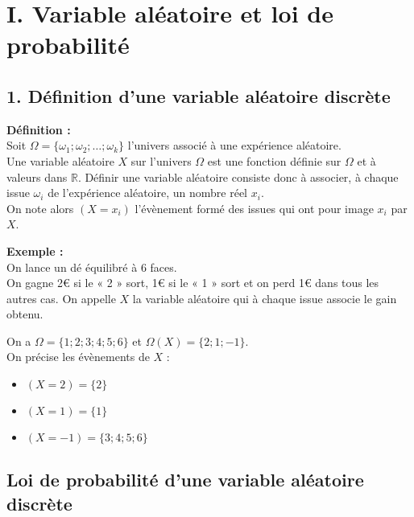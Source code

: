 \documentclass[11pt,a4paper]{article}
\title{\doctitre}
\author{\docniveau \\ \doctheme\text{ - }\doctype}
\date{}
\begin{document}
\maketitle
\pagestyle{custom}
\thispagestyle{custom}

\section*{I. Variable aléatoire et loi de probabilité}

\subsection*{1. Définition d'une variable aléatoire discrète}

\begin{mdframed}[style=definitionStyle]
    \textbf{Définition :} ~\\
    Soit $\Omega=\{\omega_1;\omega_2;\dots;\omega_k\}$ l'univers associé à une expérience aléatoire. \\
    Une variable aléatoire $X$ sur l'univers $\Omega$ est une fonction définie sur $\Omega$ et à valeurs dans $\mathbb{R}$.
    Définir une variable aléatoire consiste donc à associer, à chaque issue $\omega_i$ de l'expérience aléatoire, un nombre réel $x_i$. \\
    On note alors $\left(X=x_i\right)$ l'évènement formé des issues qui ont pour image $x_i$ par $X$.
\end{mdframed}

\textbf{Exemple :} ~\\
On lance un dé équilibré à 6 faces. \\
On gagne 2€ si le « 2 » sort, 1€ si le « 1 » sort et on perd 1€ dans tous les autres cas.
On appelle $X$ la variable aléatoire qui à chaque issue associe le gain obtenu.

On a $\Omega=\{1;2;3;4;5;6\}$ et $\Omega(X)=\{2;1;-1\}$. \\
On précise les évènements de $X$ :
\begin{itemize}
    \item $(X=2)=\{2\}$
    \item $(X=1)=\{1\}$
    \item $(X=-1)=\{3;4;5;6\}$
\end{itemize}

\subsection*{Loi de probabilité d'une variable aléatoire discrète}
\end{document}
